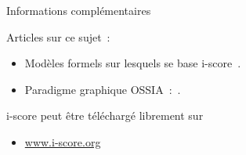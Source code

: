 \begin{block}{Informations complémentaires}
      {\small Articles sur ce sujet~:
      \begin{itemize}
        \item Modèles formels sur lesquels se base i-score~\cite{allombert_system_2007,arias_modelling_2014}.
        \item Paradigme graphique OSSIA~:~\cite{celerier_ossia:_2015}.
      \end{itemize}
      \vspace{0.1in}\noindent i-score peut être téléchargé librement sur
      \begin{itemize}
        \item \url{www.i-score.org}
      \end{itemize}}
\end{block}